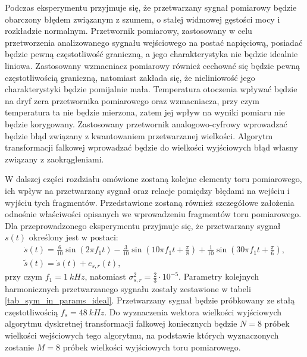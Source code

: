 Podczas eksperymentu przyjmuje się, że przetwarzany sygnał pomiarowy będzie obarczony błędem związanym z szumem, o stałej widmowej gęstości mocy i rozkładzie normalnym. Przetwornik pomiarowy, zastosowany w celu przetworzenia analizowanego sygnału wejściowego na postać napięciową, posiadać będzie pewną częstotliwość graniczną, a jego charakterystyka nie będzie idealnie liniowa. Zastosowany wzmacniacz pomiarowy również cechować się będzie pewną częstotliwością graniczną, natomiast zakłada się, że nieliniowość jego charakterystyki będzie pomijalnie mała. Temperatura otoczenia wpływać będzie na dryf zera przetwornika pomiarowego oraz wzmacniacza, przy czym temperatura ta nie będzie mierzona, zatem jej wpływ na wyniki pomiaru nie będzie korygowany. Zastosowany przetwornik analogowo-cyfrowy wprowadzać będzie błąd związany z kwantowaniem przetwarzanej wielkości. Algorytm transformacji falkowej wprowadzać będzie do wielkości wyjściowych błąd własny związany z zaokrągleniami.

W dalszej części rozdziału omówione zostaną kolejne elementy toru pomiarowego, ich wpływ na przetwarzany sygnał oraz relacje pomiędzy błędami na wejściu i wyjściu tych fragmentów. Przedstawione zostaną również szczegółowe założenia odnośnie właściwości opisanych we wprowadzeniu fragmentów toru pomiarowego. Dla przeprowadzonego eksperymentu przyjmuje się, że przetwarzany sygnał $s(t)$ określony jest w postaci:
\begin{gather}
\dot{s}(t) = \frac{6}{10} \sin(2 \pi f_{1} t) - \frac{3}{10} \sin(10 \pi f_{1} t + \frac{\pi}{8}) + \frac{1}{10} \sin(30 \pi f_{1} t + \frac{\pi}{6}) \label{eqn_sym_in_ideal}, \\
\tilde{s}(t) = \dot{s}(t) + e_{s,r}(t) \label{eqn_sym_in_real},
\end{gather}
przy czym $f_{1} = \qty{1}{kHz}$, natomiast $\sigma_{s,r}^{2} = \frac{2}{3} \cdot 10^{-5}$. Parametry kolejnych harmonicznych przetwarzanego sygnału zostały zestawione w tabeli \ref{tab_sym_in_params_ideal}. Przetwarzany sygnał będzie próbkowany ze stałą częstotliwością $f_{s} = \qty{48}{kHz}$. Do wyznaczenia wektora wielkości wyjściowych algorytmu dyskretnej transformacji falkowej koniecznych będzie $N = 8$ próbek wielkości wejściowych tego algorytmu, na podstawie których wyznaczonych zostanie $M = 8$ próbek wielkości wyjściowych toru pomiarowego.

